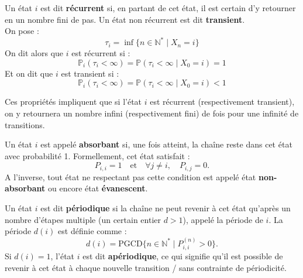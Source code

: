 \documentclass{article}
\begin{document}
\begin{tcolorbox}[colback=white,colframe=blue!80!black,title=État récurrent/transient]
Un état $i$ est dit \textbf{récurrent} si, en partant de cet état, il est certain d'y retourner en un nombre fini de pas. Un état non récurrent est dit \textbf{transient}. \\

On pose :
\[
\tau_i = \inf\{n \in \mathbb{N}^{*} \mid X_n = i\}
\]
On dit alors que $i$ est récurrent si :
\[
\mathbb{P}_i(\tau_i < \infty) = \mathbb{P}(\tau_i < \infty \mid X_0 = i) = 1
\]
Et on dit que $i$ est transient si :
\[
\mathbb{P}_i(\tau_i < \infty) = \mathbb{P}(\tau_i < \infty \mid X_0 = i) < 1
\]
\end{tcolorbox}

Ces propriétés impliquent que si l'état $i$ est récurrent (respectivement transient), on y retournera un nombre infini (respectivement fini) de fois pour une infinité de transitions. \\

\begin{tcolorbox}[colback=white,colframe=blue!80!black,title=État absorbant/évanescent]
Un état $i$ est appelé \textbf{absorbant} si, une fois atteint, la chaîne reste dans cet état avec probabilité 1. Formellement, cet état satisfait :
\[
P_{i,i} = 1 \quad \text{et} \quad \forall j \neq i, \quad P_{i,j} = 0.
\]
A l'inverse, tout état ne respectant pas cette condition est appelé état \textbf{non-absorbant} ou encore état \textbf{évanescent}.
\end{tcolorbox}

\begin{tcolorbox}[colback=white,colframe=blue!80!black,title=État périodique/apériodique]
Un état $i$ est dit \textbf{périodique} si la chaîne ne peut revenir à cet état qu'après un nombre d'étapes multiple (un certain entier $d > 1$), appelé la période de $i$. La période $d(i)$ est définie comme :
\[
d(i) = \text{PGCD}\{n \in \mathbb{N}^{*} \mid P_{i,i}^{(n)} > 0\}.
\]
Si $d(i) = 1$, l'état $i$ est dit \textbf{apériodique}, ce qui signifie qu'il est possible de revenir à cet état à chaque nouvelle transition /  sans contrainte de périodicité.
\end{tcolorbox}

\end{document}
